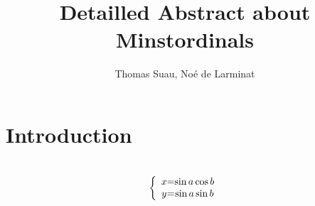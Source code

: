 \documentclass[12pt]{article}
\begin{document}
\title{Detailled Abstract about Minstordinals}
\author{Thomas Suau, Noé de Larminat}

\maketitle
{}

\tableofcontents

\section{Introduction}



\section{}


\[
\left \{
\begin{array}{c @{=} c}
    x & \sin a \cos b \\
    y & \sin a \sin b \\
\end{array}
\right.
\]





\section{}







\begin{thebibliography}{99}

\bibitem{} 

\bibitem{}


\bibitem{}

\end{thebibliography}
\end{document}
